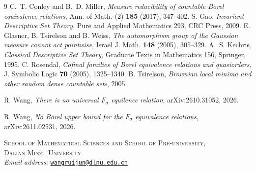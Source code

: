 \documentclass[11pt]{article}
\theoremstyle{definition}
\theoremstyle{remark}
\begin{document}
\begin{thebibliography}{9}
 C.~T. Conley and B.~D. Miller,
\emph{Measure reducibility of countable Borel equivalence relations},
Ann. of Math. (2) \textbf{185} (2017), 347--402.
 S. Gao, \emph{Invariant Descriptive Set Theory},
Pure and Applied Mathematics 293, CRC Press, 2009.
 E. Glasner, B. Tsirelson and B. Weiss,
\emph{The automorphism group of the Gaussian measure cannot act pointwise},
Israel J. Math. \textbf{148} (2005), 305--329.
 A.~S. Kechris, \emph{Classical Descriptive Set Theory},
Graduate Texts in Mathematics 156, Springer, 1995.
 C. Rosendal,
\emph{Cofinal families of Borel equivalence relations and quasiorders},
J. Symbolic Logic \textbf{70} (2005), 1325--1340.
 B. Tsirelson,
\emph{Brownian local minima and other random dense countable sets}, 2005.

 R. Wang,
\emph{There is no universal $F_\sigma$ equilence relation}, arXiv:2610.31052, 2026.

 R. Wang,
\emph{No Borel upper bound for the $F_\sigma$ equivalence relations}, arXiv:2611.02531, 2026.
\end{thebibliography}
\noindent\begin{minipage}{\textwidth}
\small
\textsc{School of Mathematical Sciences and School of Pre-university,}\\
\textsc{Dalian Minzu University}\\[0.4em]
\textit{Email address:}\enspace
\href{mailto:wangruijun@dlnu.edu.cn}{\texttt{wangruijun@dlnu.edu.cn}}
\end{minipage}
\end{document}

